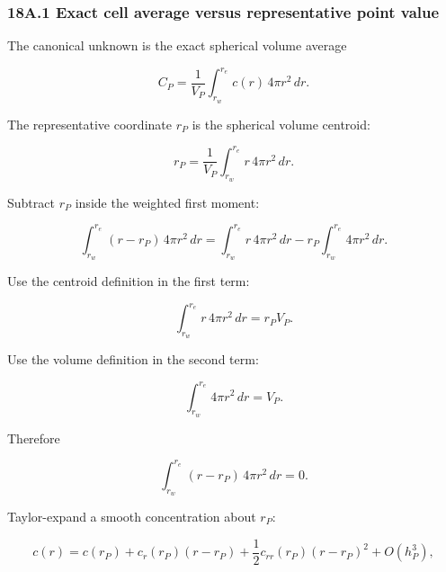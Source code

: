 \documentclass[11pt,a4paper]{article}
\begin{document}
\subsubsection*{18A.1 Exact cell average versus representative point value}

The canonical unknown is the exact spherical volume average

\begin{equation}
C_P
=
\frac1{V_P}
\int_{r_w}^{r_e}
c(r)\,4\pi r^2\,dr.
\tag{TRISO-ACC-100}
\label{eq:triso-acc-100}
\end{equation}

The representative coordinate $r_P$ is the spherical volume centroid:

\begin{equation}
r_P
=
\frac1{V_P}
\int_{r_w}^{r_e}
r\,4\pi r^2\,dr.
\tag{TRISO-ACC-101}
\label{eq:triso-acc-101}
\end{equation}

Subtract $r_P$ inside the weighted first moment:

\begin{equation}
\int_{r_w}^{r_e}
(r-r_P)\,4\pi r^2\,dr
=
\int_{r_w}^{r_e}
r\,4\pi r^2\,dr
-
r_P
\int_{r_w}^{r_e}
4\pi r^2\,dr.
\tag{TRISO-ACC-102}
\label{eq:triso-acc-102}
\end{equation}

Use the centroid definition in the first term:

\begin{equation}
\int_{r_w}^{r_e}
r\,4\pi r^2\,dr
=
r_PV_P.
\tag{TRISO-ACC-103}
\label{eq:triso-acc-103}
\end{equation}

Use the volume definition in the second term:

\begin{equation}
\int_{r_w}^{r_e}
4\pi r^2\,dr
=
V_P.
\tag{TRISO-ACC-104}
\label{eq:triso-acc-104}
\end{equation}

Therefore

\begin{equation}
\boxed{
\int_{r_w}^{r_e}
(r-r_P)\,4\pi r^2\,dr
=
0.
}
\tag{TRISO-ACC-105}
\label{eq:triso-acc-105}
\end{equation}

Taylor-expand a smooth concentration about $r_P$:

\begin{equation}
c(r)
=
c(r_P)
+
c_r(r_P)(r-r_P)
+
\frac12c_{rr}(r_P)(r-r_P)^2
+
O(h_P^3),
\tag{TRISO-ACC-106}
\label{eq:triso-acc-106}
\end{equation}
\end{document}
